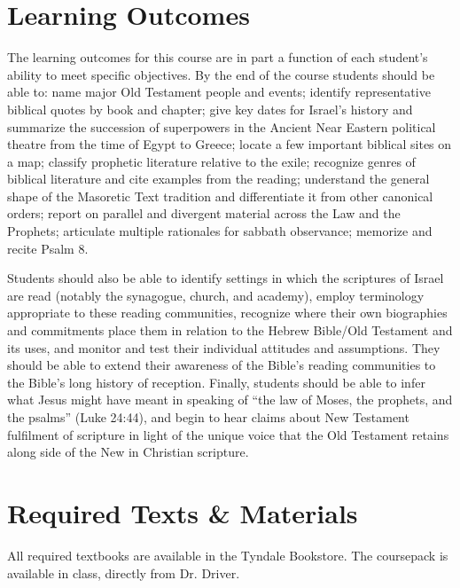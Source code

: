 \documentclass[titlepage]{article}
\newcommand\incl{../includes}
\begin{document}


\section{Learning Outcomes}
\label{outcomes}

The learning outcomes for this course are in part a function of each
student's ability to meet specific objectives. By the end of the course
students should be able to:
	name major Old Testament people and events;
	identify representative biblical quotes by book and chapter;
	give key dates for Israel's history and summarize the succession of superpowers in the Ancient Near Eastern political theatre from the time of Egypt to Greece;
	locate a few important biblical sites on a map;
	classify prophetic literature relative to the exile;
	recognize genres of biblical literature and cite examples from the reading;
	understand the general shape of the Masoretic Text tradition and differentiate it from other canonical orders;
	report on parallel and divergent material across the Law and the Prophets;
	articulate multiple rationales for sabbath observance;
	memorize and recite Psalm 8.

Students should also be able to identify settings in which the
scriptures of Israel are read (notably the synagogue, church, and
academy), employ terminology appropriate to these reading communities,
recognize where their own biographies and commitments place them in
relation to the Hebrew Bible/Old Testament and its uses, and monitor and
test their individual attitudes and assumptions. They should be able to
extend their awareness of the Bible's reading communities to the Bible's
long history of reception. Finally, students should be able to infer
what Jesus might have meant in speaking of ``the law of Moses, the
prophets, and the psalms'' (Luke 24:44), and begin to hear claims about
New Testament fulfilment of scripture in light of the unique voice that
the Old Testament retains along side of the New in Christian scripture.

\section{Required Texts \& Materials}
\label{texts}

All required textbooks are available in the Tyndale Bookstore. The
coursepack is available in class, directly from Dr. Driver.
\end{document}
